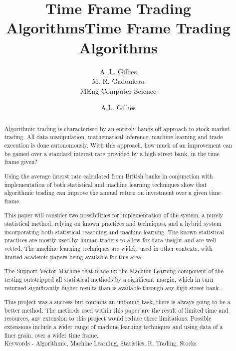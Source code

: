 \documentclass[conference]{IEEEtran}
\title{Time Frame Trading Algorithms}
\author{A. L. Gillies\\ M. R. Gadouleau\\ MEng Computer Science}
\title{Time Frame Trading Algorithms}
\author{A.L. Gillies}
\date{}
\begin{document}
\maketitle

\thispagestyle{plain}
\pagestyle{plain}

\noindent
\begin{abstract}

Algorithmic trading is characterised by an entirely hands off approach to stock market trading. All data manipulation, mathematical inference, machine learning and trade execution is done autonomously. With this approach, how much of an improvement can be gained over a standard interest rate provided by a high street bank, in the time frame given?

Using the average interst rate calculated from British banks in conjunction with implementation of both statistical and machine learning techniques show that algorithmic trading can improve the annual return on investment over a given time frame.

This paper will consider two possibilities for implementation of the system, a purely statistical method, relying on known practices and techniques, and a hybrid system incorporating both statistical reasoning and machine learning. The known statistical practices are mostly used by human traders to allow for data insight and are well vetted. \cite{Murphy1999} The machine learning techniques are widely used in other contexts, with limited academic papers being available for this area.

The Support Vector Machine that made up the Machine Learning component of the testing outstripped all statistical methods by a significant margin, which in turn returned significantly higher results than is available through any high street bank.

This project was a success but contains an unbound task, there is always going to be a better method. The methods used within this paper are the result of limited time and resources, any extension to this project would reduce these limitations. Possible extensions include a wider range of machine learning techniques and using data of a finer grain, over a wider time frame.\\

\noindent
Keywords - Algorithmic, Machine Learning, Statistics, R, Trading, Stocks

\end{abstract}
\end{document}
